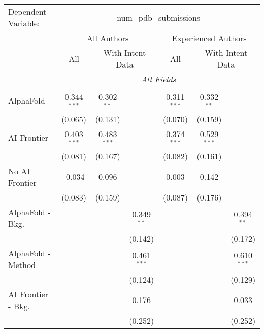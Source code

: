 \begingroup
\centering
\begin{tabular}{lcccccc}
   \tabularnewline \midrule \midrule
   Dependent Variable: & \multicolumn{6}{c}{num\_pdb\_submissions}\\
 & \multicolumn{3}{c}{All Authors} & \multicolumn{3}{c}{Experienced Authors} \\
\cmidrule(lr){2-4} \cmidrule(lr){5-7}
 & \multicolumn{1}{c}{All} & \multicolumn{2}{c}{With Intent Data} & \multicolumn{1}{c}{All} & \multicolumn{2}{c}{With Intent Data} \\
\cmidrule(lr){2-2} \cmidrule(lr){3-4} \cmidrule(lr){5-5} \cmidrule(lr){6-7}
 & \multicolumn{6}{c}{\textit{All Fields}} \\ \\
   AlphaFold               & 0.344$^{***}$ & 0.302$^{**}$  &               & 0.311$^{***}$ & 0.332$^{**}$  &   \\   
                           & (0.065)       & (0.131)       &               & (0.070)       & (0.159)       &   \\   
   AI Frontier             & 0.403$^{***}$ & 0.483$^{***}$ &               & 0.374$^{***}$ & 0.529$^{***}$ &   \\   
                           & (0.081)       & (0.167)       &               & (0.082)       & (0.161)       &   \\   
   No AI Frontier          & -0.034        & 0.096         &               & 0.003         & 0.142         &   \\   
                           & (0.083)       & (0.159)       &               & (0.087)       & (0.176)       &   \\   
   AlphaFold - Bkg.        &               &               & 0.349$^{**}$  &               &               & 0.394$^{**}$\\   
                           &               &               & (0.142)       &               &               & (0.172)\\   
   AlphaFold - Method      &               &               & 0.461$^{***}$ &               &               & 0.610$^{***}$\\   
                           &               &               & (0.124)       &               &               & (0.129)\\   
   AI Frontier - Bkg.      &               &               & 0.176         &               &               & 0.033\\   
                           &               &               & (0.252)       &               &               & (0.252)\\   

\end{tabular}
